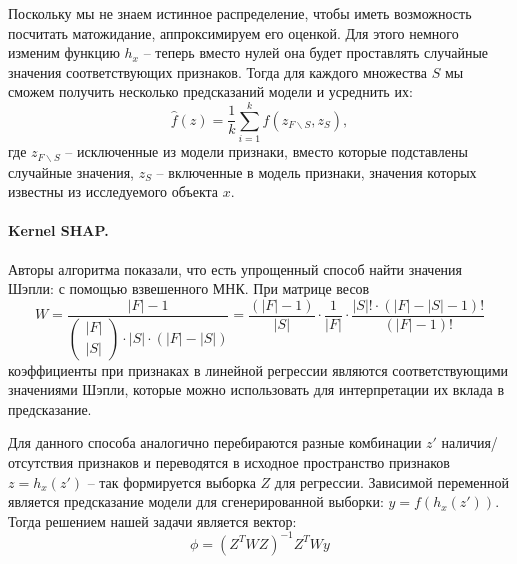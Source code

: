 Поскольку мы не знаем истинное распределение, чтобы иметь возможность посчитать матожидание, аппроксимируем его оценкой. Для этого немного изменим функцию $h_x$ -- теперь вместо нулей она будет проставлять случайные значения соответствующих признаков. Тогда для каждого множества $S$ мы сможем получить несколько предсказаний модели и усреднить их:
\[
\hat{f}(z) = \frac{1}{k} \sum\limits_{i=1}^k f(z_{F\backslash S}, z_S),
\]
где $z_{F\backslash S}$ -- исключенные из модели признаки, вместо которые подставлены случайные значения, $z_S$ -- включенные в модель признаки, значения которых известны из исследуемого объекта $x$.
\paragraph{Kernel SHAP.}
Авторы алгоритма показали, что есть упрощенный способ найти значения Шэпли: %
с помощью взвешенного МНК. При матрице весов 
\[W = \frac{|F|-1}{
\begin{pmatrix}
|F| \\
|S|
\end{pmatrix} \cdot |S| \cdot (|F| - |S|)} = \frac{(|F|-1)}{|S|} \cdot \frac{1}{|F|} \cdot \frac{|S|! \cdot (|F|-|S|-1)!}{(|F|-1)!}
\]
коэффициенты при признаках в линейной регрессии являются соответствующими значениями Шэпли, которые можно использовать для интерпретации их вклада в предсказание.

Для данного способа аналогично перебираются разные комбинации $z'$ наличия/отсутствия признаков и переводятся в исходное пространство признаков $z = h_x(z')$ -- так формируется выборка $Z$ для регрессии. Зависимой переменной является предсказание модели для сгенерированной выборки: $y = f(h_x(z'))$. Тогда решением нашей задачи является вектор: \[
\phi = (Z^T W Z)^{-1} Z^T W y
\] %





